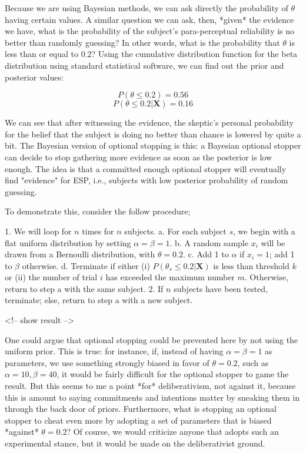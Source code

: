Because we are using Bayesian methods, we can ask directly the
probability of \(\theta\) having certain values. A similar question we
can ask, then, *given* the evidence we have, what is the probability of
the subject's para-perceptual reliability is no better than randomly
guessing? In other words, what is the probability that \(\theta\) is
less than or equal to \(0.2\)? Using the cumulative distribution
function for the beta distribution using standard statistical software,
we can find out the prior and posterior values:

\[P(\theta \leq 0.2) = 0.56\] \[P(\theta \leq 0.2|\mathbf{X}) = 0.16\]

We can see that after witnessing the evidence, the skeptic's personal
probability for the belief that the subject is doing no better than
chance is lowered by quite a bit. The Bayesian version of optional
stopping is this: a Bayesian optional stopper can decide to stop
gathering more evidence as soon as the posterior is low enough. The idea
is that a committed enough optional stopper will eventually find
"evidence" for ESP, i.e., subjects with low posterior probability of
random guessing.

To demonstrate this, consider the follow procedure;

1. We will loop for \(n\) times for \(n\) subjects. a. For each subject
\(s\), we begin with a flat uniform distribution by setting
\(\alpha = \beta = 1\). b. A random sample \(x_i\) will be drawn from a
Bernoulli distribution, with \(\theta = 0.2\). c. Add 1 to \(\alpha\) if
\(x_i =1\); add 1 to \(\beta\) otherwise. d. Terminate if either (i)
\(P(\theta_s \leq 0.2|\mathbf{X})\) is less than threshold \(k\) or (ii)
the number of trial \(i\) has exceeded the maximum number \(m\).
Otherwise, return to step a with the same subject. 2. If \(n\) subjects
have been tested, terminate; else, return to step a with a new subject.

\textless{}!-- show result --\textgreater{}

One could argue that optional stopping could be prevented here by not
using the uniform prior. This is true: for instance, if, instead of
having \(\alpha = \beta = 1\) as parameters, we use something strongly
biased in favor of \(\theta = 0.2\), such as
\(\alpha = 10, \beta = 40\), it would be fairly difficult for the
optional stopper to game the result. But this seems to me a point *for*
deliberativism, not against it, because this is amount to saying
commitments and intentions matter by sneaking them in through the back
door of priors. Furthermore, what is stopping an optional stopper to
cheat even more by adopting a set of parameters that is biased *against*
\(\theta = 0.2\)? Of course, we would criticize anyone that adopts such
an experimental stance, but it would be made on the deliberativist
ground.

